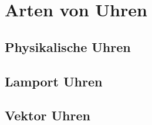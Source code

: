 \section{Arten von Uhren}
\subsection{Physikalische Uhren}
\subsection{Lamport Uhren}
\subsection{Vektor Uhren}
